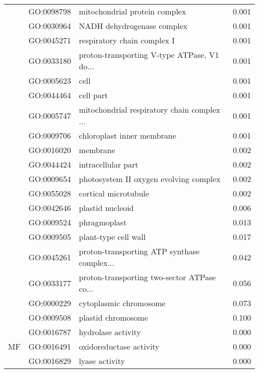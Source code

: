 \begin{longtable}{lllr}
   & GO:0098798 &                mitochondrial protein complex &         0.001 \\
   & GO:0030964 &                   NADH dehydrogenase complex &         0.001 \\
   & GO:0045271 &                  respiratory chain complex I &         0.001 \\
   & GO:0033180 &  proton-transporting V-type ATPase, V1 do... &         0.001 \\
   & GO:0005623 &                                         cell &         0.001 \\
   & GO:0044464 &                                    cell part &         0.001 \\
   & GO:0005747 &  mitochondrial respiratory chain complex ... &         0.001 \\
   & GO:0009706 &                   chloroplast inner membrane &         0.001 \\
   & GO:0016020 &                                     membrane &         0.002 \\
   & GO:0044424 &                           intracellular part &         0.002 \\
   & GO:0009654 &       photosystem II oxygen evolving complex &         0.002 \\
   & GO:0055028 &                         cortical microtubule &         0.002 \\
   & GO:0042646 &                             plastid nucleoid &         0.006 \\
   & GO:0009524 &                                 phragmoplast &         0.013 \\
   & GO:0009505 &                         plant-type cell wall &         0.017 \\
   & GO:0045261 &  proton-transporting ATP synthase complex... &         0.042 \\
   & GO:0033177 &  proton-transporting two-sector ATPase co... &         0.056 \\
   & GO:0000229 &                       cytoplasmic chromosome &         0.073 \\
   & GO:0009508 &                           plastid chromosome &         0.100 \\
\cline{1-4}
\multirow{94}{*}{MF} & GO:0016787 &                           hydrolase activity &         0.000 \\
   & GO:0016491 &                      oxidoreductase activity &         0.000 \\
   & GO:0016829 &                               lyase activity &         0.000 \\

\end{longtable}
